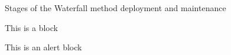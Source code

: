 \begin{frame}{Stages of the Waterfall method}
deployment and maintenance
    \begin{block}{This is a block}
        \lipsum[1][1-3]
    \end{block}   
    \begin{alertblock}{This is an alert block}
        \lipsum[2][2-5]
    \end{alertblock}  
\end{frame}